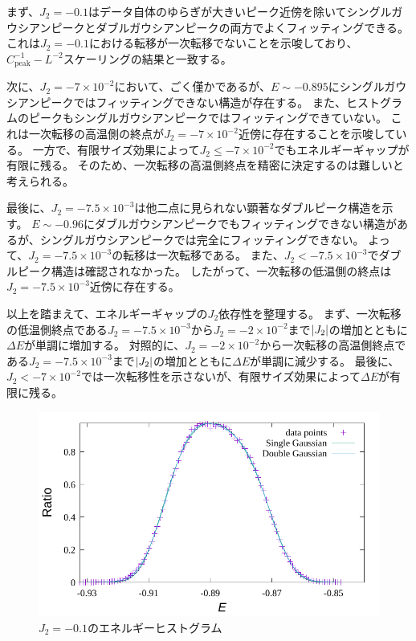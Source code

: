 \documentclass[12pt,titlepage,dvipdfmx]{jarticle}
\begin{document}
まず、$J_2=-0.1$はデータ自体のゆらぎが大きいピーク近傍を除いてシングルガウシアンピークとダブルガウシアンピークの両方でよくフィッティングできる。これは$J_2=-0.1$における転移が一次転移でないことを示唆しており、$C^{-1}_{\mathrm{peak}}-L^{-2}$スケーリングの結果と一致する。

次に、$J_2=-7\times10^{-2}$において、ごく僅かであるが、$E\sim-0.895$にシングルガウシアンピークではフィッティングできない構造が存在する。
また、ヒストグラムのピークもシングルガウシアンピークではフィッティングできていない。
これは一次転移の高温側の終点が$J_2=-7\times10^{-2}$近傍に存在することを示唆している。
一方で、有限サイズ効果によって$J_2\le-7\times10^{-2}$でもエネルギーギャップが有限に残る。
そのため、一次転移の高温側終点を精密に決定するのは難しいと考えられる。

最後に、$J_2=-7.5\times10^{-3}$は他二点に見られない顕著なダブルピーク構造を示す。
$E\sim-0.96$にダブルガウシアンピークでもフィッティングできない構造があるが、シングルガウシアンピークでは完全にフィッティングできない。
よって、$J_2=-7.5\times10^{-3}$の転移は一次転移である。
また、$J_2<-7.5\times10^{-3}$でダブルピーク構造は確認されなかった。
したがって、一次転移の低温側の終点は$J_2=-7.5\times10^{-3}$近傍に存在する。

以上を踏まえて、エネルギーギャップの$J_2$依存性を整理する。
まず、一次転移の低温側終点である$J_2=-7.5\times10^{-3}$から$J_2=-2\times10^{-2}$まで$\abs{J_2}$の増加とともに$\Delta E$が単調に増加する。
対照的に、$J_2=-2\times10^{-2}$から一次転移の高温側終点である$J_2=-7.5\times10^{-3}$まで$\abs{J_2}$の増加とともに$\Delta E$が単調に減少する。
最後に、$J_2<-7\times10^{-2}$では一次転移性を示さないが、有限サイズ効果によって$\Delta E$が有限に残る。


\begin{figure}[H]
   \centering
   \includegraphics[width=12cm]{figure/energy_histogram_j2_-1e-1.pdf}
   \caption{$J_2=-0.1$のエネルギーヒストグラム}
\end{figure}
\end{document}
